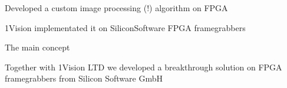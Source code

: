 \begin{frame}[label=real-10]{Developed a custom image processing (!) algorithm on FPGA}
    \centering{}
    \end{frame}

    \begin{frame}[label=real-11]{1Vision implementated it on SiliconSoftware FPGA framegrabbers}
\end{frame}

\begin{frame}[label=real-12]{The main concept}
    \centering{}
\end{frame}


\begin{frame}[label=real-9]{Together with 1Vision LTD we developed a breakthrough solution on FPGA framegrabbers from Silicon Software GmbH}
    \centering{}
\end{frame}





%